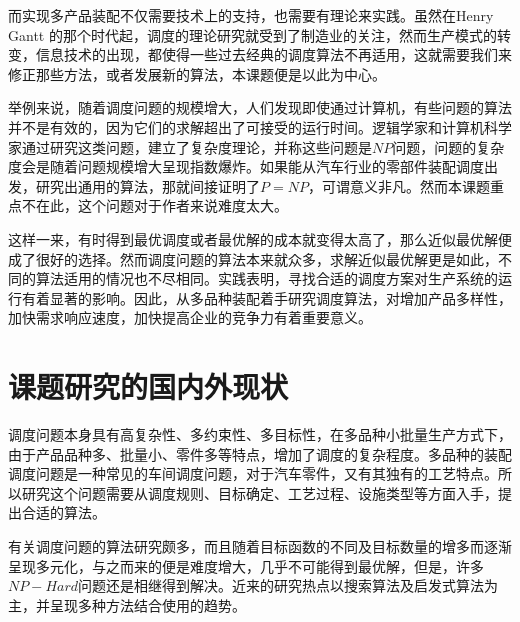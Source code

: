 而实现多产品装配不仅需要技术上的支持，也需要有理论来实践。虽然在Henry Gantt 的那个时代起，调度的理论研究就受到了制造业的关注，然而生产模式的转变，信息技术的出现，都使得一些过去经典的调度算法不再适用，这就需要我们来修正那些方法，或者发展新的算法，本课题便是以此为中心。

举例来说，随着调度问题的规模增大，人们发现即使通过计算机，有些问题的算法并不是有效的，因为它们的求解超出了可接受的运行时间。逻辑学家和计算机科学家通过研究这类问题，建立了复杂度理论，并称这些问题是$NP$问题，问题的复杂度会是随着问题规模增大呈现指数爆炸。如果能从汽车行业的零部件装配调度出发，研究出通用的算法，那就间接证明了$P=NP$，可谓意义非凡。然而本课题重点不在此，这个问题对于作者来说难度太大。

这样一来，有时得到最优调度或者最优解的成本就变得太高了，那么近似最优解便成了很好的选择。然而调度问题的算法本来就众多，求解近似最优解更是如此，不同的算法适用的情况也不尽相同。实践表明，寻找合适的调度方案对生产系统的运行有着显著的影响。因此，从多品种装配着手研究调度算法，对增加产品多样性，加快需求响应速度，加快提高企业的竞争力有着重要意义。


\section{课题研究的国内外现状}
调度问题本身具有高复杂性、多约束性、多目标性，在多品种小批量生产方式下，由于产品品种多、批量小、零件多等特点，增加了调度的复杂程度。多品种的装配调度问题是一种常见的车间调度问题，对于汽车零件，又有其独有的工艺特点。所以研究这个问题需要从调度规则、目标确定、工艺过程、设施类型等方面入手，提出合适的算法。

有关调度问题的算法研究颇多，而且随着目标函数的不同及目标数量的增多而逐渐呈现多元化，与之而来的便是难度增大，几乎不可能得到最优解，但是，许多$NP - Hard$问题还是相继得到解决。近来的研究热点以搜索算法及启发式算法为主，并呈现多种方法结合使用的趋势。
